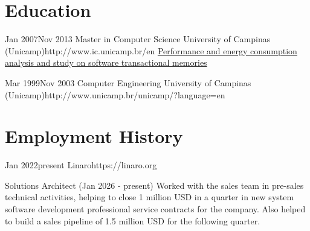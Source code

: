 \documentclass[10pt]{article} %
\begin{document}
\section{Education}

\education
{Jan 2007}{Nov 2013}
{Master in Computer Science}
{University of Campinas (Unicamp)}{http://www.ic.unicamp.br/en}
{\href{http://repositorio.unicamp.br/jspui/handle/REPOSIP/275619}{Performance and energy consumption analysis and study on software transactional memories}}


\education
{Mar 1999}{Nov 2003}
{Computer Engineering}
{University of Campinas (Unicamp)}{http://www.unicamp.br/unicamp/?language=en}


\section{Employment History}

\employer
{Jan 2022}{present}
{Linaro}{https://linaro.org}

\job
{Solutions Architect (Jan 2026 - present)}
{Worked with the sales team in pre-sales technical activities, helping to close 1 million USD in a quarter in new system software development professional service contracts for the company. Also helped to build a sales pipeline of 1.5 million USD for the following quarter.}
\end{document}
